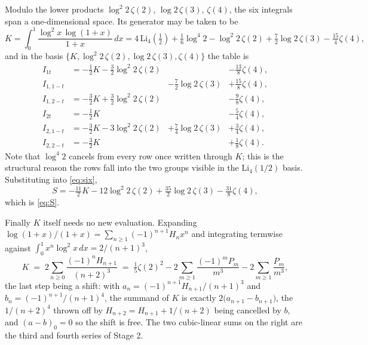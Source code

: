 \documentclass[11pt]{article}
\begin{document}
Modulo the lower products $\log^2\!2\,\zeta(2)$, $\log 2\,\zeta(3)$,
$\zeta(4)$, the six integrals span a one-dimensional space.  Its generator
may be taken to be
\begin{equation}\label{eq:K}
K = \int_0^1 \frac{\log^2 x\,\log(1+x)}{1+x}\,dx
  = 4\,\mathrm{Li}_4(\tfrac12) + \tfrac16\log^4 2 - \log^2\!2\,\zeta(2)
    + \tfrac72\log 2\,\zeta(3) - \tfrac{15}{4}\zeta(4),
\end{equation}
and in the basis $\{K, \log^2\!2\,\zeta(2), \log 2\,\zeta(3), \zeta(4)\}$
the table is
\[
\begin{array}{llll}
I_{1t}     &= -\tfrac12 K - \tfrac32\log^2\!2\,\zeta(2) &                        &- \tfrac{13}{8}\zeta(4),\\
I_{1,1-t}  &                                            &- \tfrac72\log 2\,\zeta(3) &+ \tfrac{15}{8}\zeta(4),\\
I_{1,2-t}  &= -\tfrac32 K + \tfrac32\log^2\!2\,\zeta(2) &                        &- \tfrac{9}{8}\zeta(4),\\
I_{2t}     &= -\tfrac12 K                               &                        &- \tfrac54\zeta(4),\\
I_{2,1-t}  &= -\tfrac32 K - 3\log^2\!2\,\zeta(2)        &+ \tfrac74\log 2\,\zeta(3) &+ \tfrac34\zeta(4),\\
I_{2,2-t}  &= -\tfrac32 K                               &                        &+ \tfrac18\zeta(4).
\end{array}
\]
Note that $\log^4 2$ cancels from every row once written through $K$; this
is the structural reason the rows fall into the two groups visible in the
$\mathrm{Li}_4(1/2)$ basis.  Substituting into \eqref{eq:six},
\[
S = -\tfrac{11}{2}K - 12\log^2\!2\,\zeta(2) + \tfrac{35}{2}\log 2\,\zeta(3)
    - \tfrac{31}{8}\zeta(4),
\]
which is \eqref{eq:S}.

Finally $K$ itself needs no new evaluation.  Expanding
$\log(1+x)/(1+x) = \sum_{n\ge1}(-1)^{n+1}H_n x^n$ and integrating termwise
against $\int_0^1 x^{n}\log^2 x\,dx = 2/(n+1)^3$,
\[
K \;=\; 2\sum_{n\ge 0} \frac{(-1)^n H_{n+1}}{(n+2)^3}
  \;=\; \tfrac15\zeta(2)^2 - 2\!\sum_{m\ge1}\frac{(-1)^m P_m}{m^3}
        - 2\!\sum_{m\ge1}\frac{P_m}{m^3},
\]
the last step being a shift: with $a_n = (-1)^{n+1}H_{n+1}/(n+1)^3$ and
$b_n = (-1)^{n+1}/(n+1)^4$, the summand of $K$ is exactly
$2\bigl(a_{n+1} - b_{n+1}\bigr)$, the $1/(n+2)^4$ thrown off by
$H_{n+2} = H_{n+1} + 1/(n+2)$ being cancelled by $b$, and
$(a-b)_0 = 0$ so the shift is free.  The two cubic-linear sums on the
right are the third and fourth series of Stage 2.
\end{document}
